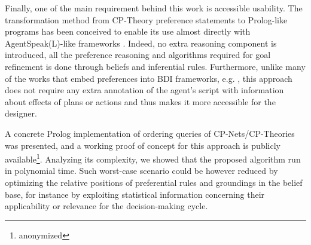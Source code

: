 Finally, one of the main requirement behind this work is accessible usability. The transformation method from CP-Theory preference statements to Prolog-like programs has been conceived to enable its use almost directly with AgentSpeak(L)-like frameworks \cite{Bordini2005,Astra,mohajeriparizi_2020_run,Aschermann2018}. Indeed, no extra reasoning component is introduced, all the preference reasoning and algorithms required for goal refinement is done through beliefs and inferential rules. Furthermore, unlike many of the works that embed preferences into BDI frameworks, e.g. \cite{Visser2011,Visser2016,Dasgupta2010,Mohajeri2019,Mohajeri2020}, this approach does not require any extra annotation of the agent's script with information about effects of plans or actions and thus makes it more accessible for the designer. 

A concrete Prolog implementation of ordering queries of CP-Nets/CP-Theories was presented, and a working proof of concept for this approach is publicly available\footnote{anonymized}. Analyzing its complexity, we showed that the proposed algorithm run in polynomial time. Such worst-case scenario could be however reduced by optimizing the relative positions of preferential rules and groundings in the belief base, for instance by exploiting statistical information concerning their applicability or relevance for the decision-making cycle. %



